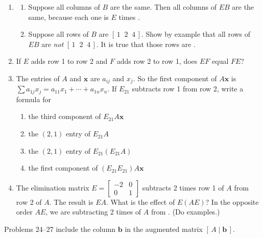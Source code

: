 \documentclass[14pt, a4paper]{article}
\begin{document}
\begin{enumerate}[resume]
    \item
          \begin{enumerate}
              \item Suppose all columns of $B$ are the same. Then all columns of $EB$ are the same, because each one is $E$ times \underline{\hspace{3em}}.
              \item Suppose all rows of $B$ are $[\,1\;\;2\;\;4\,]$. Show by example that all rows of $EB$ are \textit{not} $[\,1\;\;2\;\;4\,]$. It is true that those rows are \underline{\hspace{4em}}.
          \end{enumerate}

    \item If $E$ adds row 1 to row 2 and $F$ adds row 2 to row 1, does $EF$ equal $FE$?

    \item The entries of $A$ and $\boldsymbol{x}$ are $a_{ij}$ and $x_j$. So the first component of $A\boldsymbol{x}$ is $\sum a_{1j}x_j = a_{11}x_1 + \cdots + a_{1n}x_n$. If $E_{21}$ subtracts row 1 from row 2, write a formula for
          \begin{enumerate}
              \item the third component of $E_{21}A\boldsymbol{x}$
              \item the $(2,1)$ entry of $E_{21}A$
              \item the $(2,1)$ entry of $E_{21}(E_{21}A)$
              \item the first component of $(E_{21}E_{21})A\boldsymbol{x}$
          \end{enumerate}

    \item The elimination matrix $E = \begin{bmatrix} -2 & 0 \\ 0 & 1 \end{bmatrix}$ subtracts 2 times row 1 of $A$ from row 2 of $A$. The result is $EA$. What is the effect of $E(AE)$? In the opposite order $AE$, we are subtracting 2 times \underline{\hspace{2em}} of $A$ from \underline{\hspace{2em}}. (Do examples.)

\end{enumerate}

\noindent Problems 24--27 include the column $\boldsymbol{b}$ in the augmented matrix $[\,A \mid \boldsymbol{b}\,]$.
\end{document}
